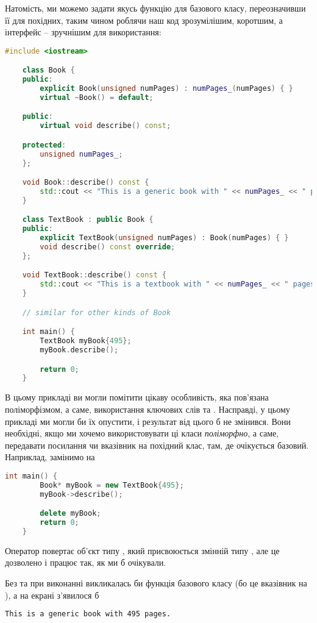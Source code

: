 \documentclass[12pt]{article}
\begin{document}
	Натомість, ми можемо задати якусь функцію для базового класу, переозначивши її для похідних, таким чином роблячи наш код зрозумілішим, коротшим, а інтерфейс -- зручнішим для використання:
	\begin{lstlisting}[language=c++,label=book,caption="Book Base Class"]
	#include <iostream>

	class Book {
	public:
		explicit Book(unsigned numPages) : numPages_(numPages) { }
		virtual ~Book() = default;

	public:
		virtual void describe() const;

	protected:
		unsigned numPages_;
	};

	void Book::describe() const {
		std::cout << "This is a generic book with " << numPages_ << " pages." << std::endl;
	}

	class TextBook : public Book {
	public:
		explicit TextBook(unsigned numPages) : Book(numPages) { }
		void describe() const override;
	};

	void TextBook::describe() const {
		std::cout << "This is a textbook with " << numPages_ << " pages." << std::endl;
	}

	// similar for other kinds of Book

	int main() {
		TextBook myBook{495};
		myBook.describe();

		return 0;
	}
	\end{lstlisting}

	В цьому прикладі ви могли помітити цікаву особливість, яка пов'язана поліморфізмом, а саме, використання ключових слів  та . Насправді, у цьому прикладі ми могли би їх опустити, і результат від цього б не змінився. Вони необхідні, якщо ми хочемо використовувати ці класи \textit{поліморфно}, а саме, передавати посилання чи вказівник на похідний клас, там, де очікується базовий. Наприклад, замінимо  на 
	\begin{lstlisting}[language=c++]
	int main() {
		Book* myBook = new TextBook{495};
		myBook->describe();

		delete myBook;
		return 0;
	}
	\end{lstlisting}

	Оператор  повертає об'єкт типу , який присвоюється змінній типу , але це дозволено і працює так, як ми б очікували.

	Без  та  при виконанні  викликалась би функція  базового класу  (бо  це вказівник на ), а на екрані з'явилося б 
	\begin{lstlisting}[language=bash]
		This is a generic book with 495 pages.
	\end{lstlisting}
\end{document}
